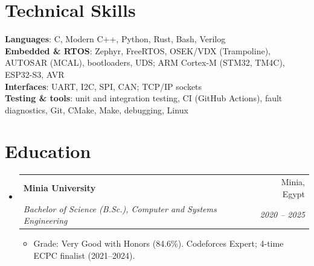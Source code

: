 \documentclass[letterpaper,11pt]{article}
\makeatletter
\newcommand{\resumeItem}[1]{
  \item\small{
    {#1 \vspace{-2pt}}
  }
}
\newcommand{\resumeSubheading}[4]{
  \vspace{-2pt}\item
    \begin{tabular*}{0.97\textwidth}[t]{l@{\extracolsep{\fill}}r}
      \textbf{#1} & #2 \\
      \textit{\small#3} & \textit{\small #4} \\
    \end{tabular*}\vspace{-7pt}
}
\newcommand{\resumeSubHeadingListStart}{\begin{itemize}[leftmargin=0.15in, label={}]}
\newcommand{\resumeSubHeadingListEnd}{\end{itemize}}
\newcommand{\resumeItemListStart}{\begin{itemize}}
\newcommand{\resumeItemListEnd}{\end{itemize}\vspace{-5pt}}
\makeatother
\begin{document}
\section{Technical Skills}
 \begin{itemize}[leftmargin=0.15in, label={}]
    \small{\item{
     \textbf{Languages}{: C, Modern C++, Python, Rust, Bash, Verilog} \\
     \textbf{Embedded \& RTOS}{: Zephyr, FreeRTOS, OSEK/VDX (Trampoline), AUTOSAR (MCAL), bootloaders, UDS; ARM Cortex-M (STM32, TM4C), ESP32-S3, AVR} \\
     \textbf{Interfaces}{: UART, I2C, SPI, CAN; TCP/IP sockets} \\
     \textbf{Testing \& tools}{: unit and integration testing, CI (GitHub Actions), fault diagnostics, Git, CMake, Make, debugging, Linux}
    }}
 \end{itemize}

\section{Education}
  \resumeSubHeadingListStart
    \resumeSubheading
      {Minia University}{Minia, Egypt}
      {Bachelor of Science (B.Sc.), Computer and Systems Engineering}{2020 -- 2025}
      \resumeItemListStart
        \resumeItem{Grade: Very Good with Honors (84.6\%). Codeforces Expert; 4-time ECPC finalist (2021--2024).}
      \resumeItemListEnd
  \resumeSubHeadingListEnd


\end{document}
